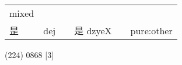 \documentclass[14pt,a4paper]{scrartcl}
\begin{document}
\begin{longtable}[c]{@{}llllll@{}}
\begin{minipage}[t]{0.14\columnwidth}
mixed
\strut\end{minipage}\tabularnewline
\begin{minipage}[t]{0.14\columnwidth}\raggedright\strut
昰
\strut\end{minipage} &
\begin{minipage}[t]{0.14\columnwidth}\raggedright\strut
dej
\strut\end{minipage} &
\begin{minipage}[t]{0.14\columnwidth}\raggedright\strut
\strut\end{minipage} &
\begin{minipage}[t]{0.14\columnwidth}\raggedright\strut
是 dzyeX
\strut\end{minipage} &
\begin{minipage}[t]{0.14\columnwidth}\raggedright\strut
\strut\end{minipage} &
\begin{minipage}[t]{0.14\columnwidth}\raggedright\strut
pure:other
\strut\end{minipage}\tabularnewline
\bottomrule
\end{longtable}

(224) 0868 {[}3{]}
\end{document}
